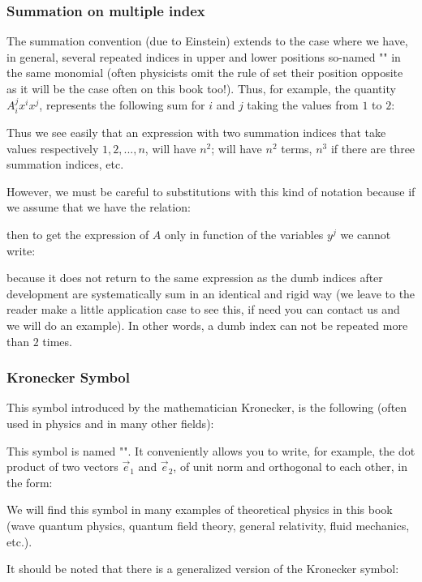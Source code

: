	\pagebreak
	\subsubsection{Summation on multiple index}\label{einstein summation convention}
	The summation convention (due to Einstein) extends to the case where we have, in general, several repeated indices in upper and lower positions so-named "" in the same monomial (often physicists omit the rule of set their position opposite as it will be the case often on this book too!). Thus, for example, the quantity $A_i^jx^ix^j$, represents the following sum for $i$ and $j$ taking the values from $1$ to $2$:
		
	Thus we see easily that an expression with two summation indices that take values respectively $1,2,...,n$, will have $n^2$; will have $n^2$ terms, $n^3$ if there are three summation indices, etc.
	
	However, we must be careful to substitutions with this kind of notation because if we assume that we have the relation:
	
	then to get the expression of $A$ only in function of the variables $y^j$ we cannot write:
	
	because it does not return to the same expression as the dumb indices after development are systematically sum in an identical and rigid way (we leave to the reader make a little application case to see this, if need you can contact us and we will do an example). In other words, a dumb index can not be repeated more than $2$ times.
	
	\subsubsection{Kronecker Symbol}\label{kronecker symbol}
	This symbol introduced by the mathematician Kronecker, is the following (often used in physics and in many other fields):
	
	This symbol is named "". It conveniently allows you to write, for example, the dot product of two vectors $\vec{e}_1$ and $\vec{e}_2$, of unit norm and orthogonal to each other, in the form:
	
	We will find this symbol in many examples of theoretical physics in this book (wave quantum physics, quantum field theory, general relativity, fluid mechanics, etc.).
	
	It should be noted that there is a generalized version of the Kronecker symbol:
	
